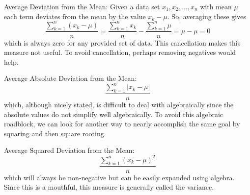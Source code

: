 \documentclass[10pt,]{book}
\theoremstyle{plain}
\theoremstyle{definition}
\theoremstyle{definition}
\theoremstyle{definition}
\numberwithin{equation}{section}
\begin{document}
Average Deviation from the Mean:  Given a data set \(x_1, x_2, ... , x_n\) with mean \(\mu\) each term deviates from the mean by the value \(x_k - \mu\). So, averaging these gives
\begin{equation*} \frac{\sum_{k=1}^n (x_k-\mu)}{n} = \frac{\sum_{k=1}^n x_k}{n} - \frac{\sum_{k=1}^n \mu}{n} = \mu - \mu = 0\end{equation*}
which is always zero for any provided set of data. This cancellation makes this measure not useful. To avoid cancellation, perhaps removing negatives would help.
%
\par
Average Absolute Deviation from the Mean:  
\begin{equation*} \frac{\sum_{k=1}^n \left | x_k-\mu \right |}{n} \end{equation*}
which, although nicely stated, is difficult to deal with algebraically since the absolute values do not simplify well algebraically. To avoid this algebraic roadblock, we can look for another way to nearly accomplish the same goal by squaring and then square rooting. 
%
\par
Average Squared Deviation from the Mean:
\begin{equation*} \frac{\sum_{k=1}^n ( x_k-\mu )^2}{n} \end{equation*}
which will always be non-negative but can be easily expanded using algebra. Since this is a mouthful, this measure is generally called the variance. 
%
\par
\end{document}
